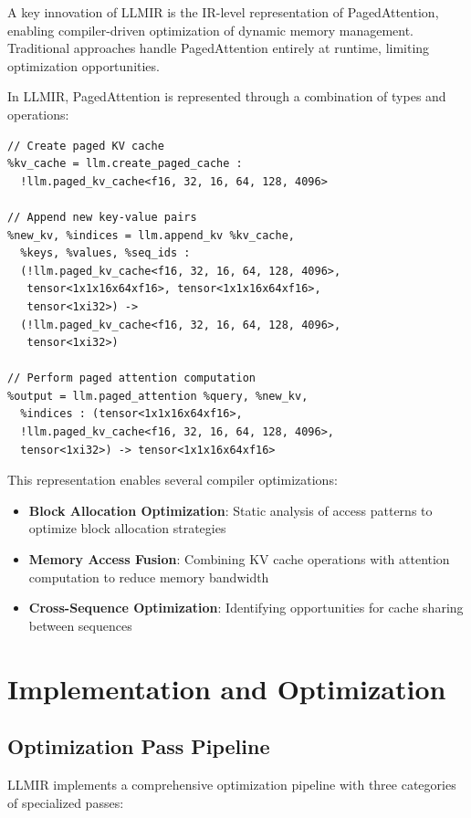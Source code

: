 \documentclass[conference]{IEEEtran}
\begin{document}
A key innovation of LLMIR is the IR-level representation of PagedAttention, enabling compiler-driven optimization of dynamic memory management. Traditional approaches handle PagedAttention entirely at runtime, limiting optimization opportunities.

In LLMIR, PagedAttention is represented through a combination of types and operations:

\begin{mlircode}
\begin{lstlisting}[style=mlir]
// Create paged KV cache
%kv_cache = llm.create_paged_cache : 
  !llm.paged_kv_cache<f16, 32, 16, 64, 128, 4096>

// Append new key-value pairs
%new_kv, %indices = llm.append_kv %kv_cache, 
  %keys, %values, %seq_ids : 
  (!llm.paged_kv_cache<f16, 32, 16, 64, 128, 4096>,
   tensor<1x1x16x64xf16>, tensor<1x1x16x64xf16>,
   tensor<1xi32>) -> 
  (!llm.paged_kv_cache<f16, 32, 16, 64, 128, 4096>,
   tensor<1xi32>)

// Perform paged attention computation
%output = llm.paged_attention %query, %new_kv, 
  %indices : (tensor<1x1x16x64xf16>,
  !llm.paged_kv_cache<f16, 32, 16, 64, 128, 4096>,
  tensor<1xi32>) -> tensor<1x1x16x64xf16>
\end{lstlisting}
\end{mlircode}

This representation enables several compiler optimizations:
\begin{itemize}
    \item \textbf{Block Allocation Optimization}: Static analysis of access patterns to optimize block allocation strategies
    \item \textbf{Memory Access Fusion}: Combining KV cache operations with attention computation to reduce memory bandwidth  
    \item \textbf{Cross-Sequence Optimization}: Identifying opportunities for cache sharing between sequences
\end{itemize}

\section{Implementation and Optimization}

\subsection{Optimization Pass Pipeline}

LLMIR implements a comprehensive optimization pipeline with three categories of specialized passes:
\end{document}

